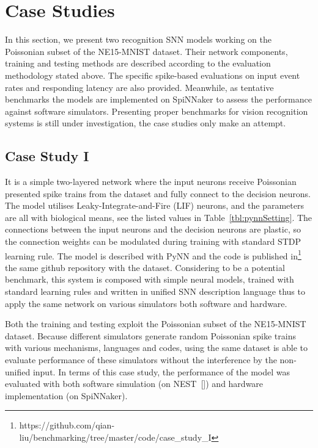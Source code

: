 \section{Case Studies}
\label{sec:test}
In this section, we present two recognition SNN models working on the Poissonian subset of the NE15-MNIST dataset.
Their network components, training and testing methods are described according to the evaluation methodology stated above.
The specific spike-based evaluations on input event rates and responding latency are also provided. 
Meanwhile, as tentative benchmarks the models are implemented on SpiNNaker to assess the performance against software simulators.
Presenting proper benchmarks for vision recognition systems is still under investigation, the case studies only make an attempt.

\subsection{Case Study I}
It is a simple two-layered network where the input neurons receive Poissonian presented spike trains from the dataset and fully connect to the decision neurons.
The model utilises Leaky-Integrate-and-Fire (LIF) neurons, and the parameters are all with biological means, see the listed values in Table~\ref{tbl:pynnSetting}.
The connections between the input neurons and the decision neurons are plastic, so the connection weights can be modulated during training with standard STDP learning rule.
The model is described with PyNN and the code is published in\footnote {https://github.com/qian-liu/benchmarking/tree/master/code/case\_study\_I} the same github repository with the dataset.
Considering to be a potential benchmark, this system is composed with simple neural models, trained with standard learning rules and written in unified SNN description language thus to apply the same network on various simulators both software and hardware.

Both the training and testing exploit the Poissonian subset of the NE15-MNIST dataset.
Because different simulators generate random Poissonian spike trains with various mechanisms, languages and codes, using the same dataset is able to evaluate performance of these simulators without the interference by the non-unified input.
In terms of this case study, the performance of the model was evaluated with both software simulation (on NEST~[\cite{gewaltig2007nest}]) and hardware implementation (on SpiNNaker).

